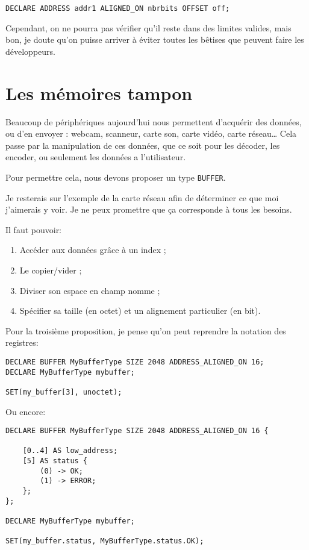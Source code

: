 \documentclass{rtxreport}
\begin{document}
\begin{lstlisting}
DECLARE ADDRESS addr1 ALIGNED_ON nbrbits OFFSET off;
\end{lstlisting}

Cependant, on ne pourra pas vérifier qu’il reste dans des limites valides, mais
bon, je doute qu’on puisse arriver à éviter toutes les bêtises que peuvent
faire les développeurs.

\section{Les mémoires tampon}

Beaucoup de périphériques aujourd’hui nous permettent d’acquérir des données,
ou d’en envoyer : webcam, scanneur, carte son, carte vidéo, carte réseau\ldots
Cela passe par la manipulation de ces données, que ce soit pour les décoder,
les encoder, ou seulement les données a l’utilisateur.

Pour permettre cela, nous devons proposer un type \texttt{BUFFER}.

Je resterais sur l’exemple de la carte réseau afin de déterminer ce que moi
j’aimerais y voir. Je ne peux promettre que ça corresponde à tous les besoins.

Il faut pouvoir:
\begin{enumerate}
	\item Accéder aux données grâce à un index ; 
	\item Le copier/vider ; 
	\item Diviser son espace en champ nomme ; 
	\item Spécifier sa taille (en octet) et un alignement particulier (en bit).
\end{enumerate}

Pour la troisième proposition, je pense qu’on peut reprendre la notation des
registres:

\begin{lstlisting}
DECLARE BUFFER MyBufferType SIZE 2048 ADDRESS_ALIGNED_ON 16;
DECLARE MyBufferType mybuffer;

SET(my_buffer[3], unoctet);
\end{lstlisting}

Ou encore:

\begin{lstlisting}
DECLARE BUFFER MyBufferType SIZE 2048 ADDRESS_ALIGNED_ON 16 {

	[0..4] AS low_address;
	[5] AS status {
		(0) -> OK;
		(1) -> ERROR;
	};
};

DECLARE MyBufferType mybuffer;

SET(my_buffer.status, MyBufferType.status.OK);
\end{lstlisting}
\end{document}
